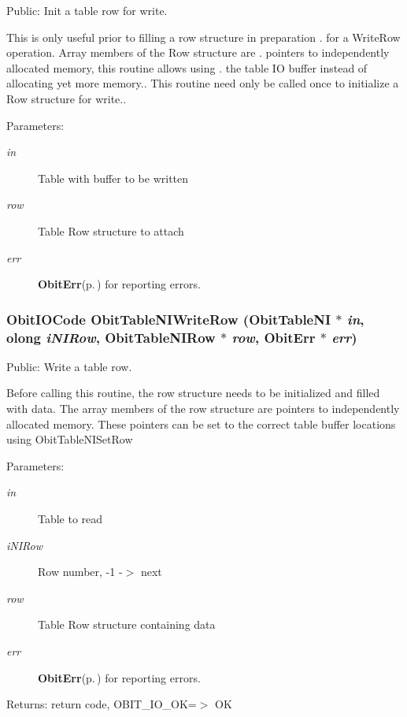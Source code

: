 Public: Init a table row for write. 

This is only useful prior to filling a row structure in preparation . for a Write\-Row operation. Array members of the Row structure are . pointers to independently allocated memory, this routine allows using . the table IO buffer instead of allocating yet more memory.. This routine need only be called once to initialize a Row structure for write.. \begin{Desc}
\item[Parameters:]
\begin{description}
\item[{\em in}]Table with buffer to be written \item[{\em row}]Table Row structure to attach \item[{\em err}]{\bf Obit\-Err}{\rm (p.\,\pageref{structObitErr})} for reporting errors. \end{description}
\end{Desc}
\subsubsection{\setlength{\rightskip}{0pt plus 5cm}Obit\-IOCode Obit\-Table\-NIWrite\-Row ({\bf Obit\-Table\-NI} $\ast$ {\em in}, {\bf olong} {\em i\-NIRow}, {\bf Obit\-Table\-NIRow} $\ast$ {\em row}, {\bf Obit\-Err} $\ast$ {\em err})}\label{ObitTableNI_8h_a20}


Public: Write a table row. 

Before calling this routine, the row structure needs to be initialized and filled with data. The array members of the row structure are pointers to independently allocated memory. These pointers can be set to the correct table buffer locations using Obit\-Table\-NISet\-Row \begin{Desc}
\item[Parameters:]
\begin{description}
\item[{\em in}]Table to read \item[{\em i\-NIRow}]Row number, -1 -$>$ next \item[{\em row}]Table Row structure containing data \item[{\em err}]{\bf Obit\-Err}{\rm (p.\,\pageref{structObitErr})} for reporting errors. \end{description}
\end{Desc}
\begin{Desc}
\item[Returns:]return code, OBIT\_\-IO\_\-OK=$>$ OK \end{Desc}
